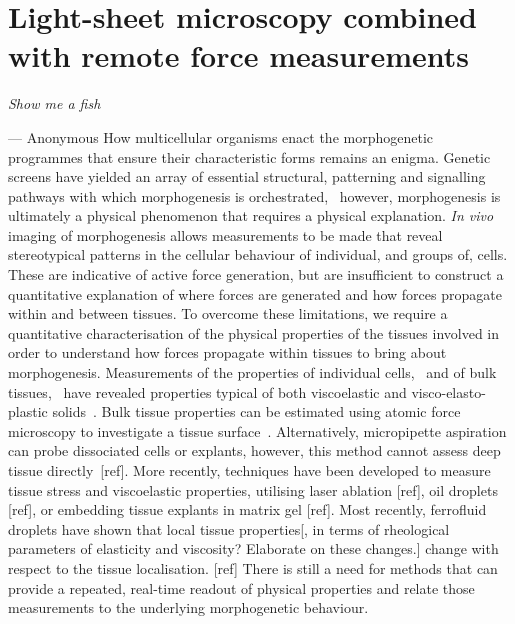 \ifpdf
    \graphicspath{{Chapter/tweezers/Figs/Raster/}{Chapter/tweezers/Figs/PDF/}{Chapter/tweezers/Figs/}}
\else
    \graphicspath{{Chapter/tweezers/Figs/Vector/}{Chapter/tweezers/Figs/}}
\fi

\chapter[Light-sheet microscopy combined with remote force measurements]{Light-sheet microscopy combined with remote force measurements}\label{chapter:tweezers}
\epigraph{\emph{Show me a fish}}{}{--- Anonymous}
How multicellular organisms enact the morphogenetic programmes that ensure their characteristic forms remains an enigma.
Genetic screens have yielded an array of essential structural, patterning and signalling pathways with which morphogenesis is orchestrated,~\cite{gilbertDevelopmentalBiology2000} however, morphogenesis is ultimately a physical phenomenon that requires a physical explanation.
\emph{In vivo} imaging of morphogenesis allows measurements to be made that reveal stereotypical patterns in the cellular behaviour of individual, and groups of, cells.
These are indicative of active force generation, but are insufficient to construct a quantitative explanation of where forces are generated and how forces propagate within and between tissues.
To overcome these limitations, we require a quantitative characterisation of the physical properties of the tissues involved in order to understand how forces propagate within tissues to bring about morphogenesis.
Measurements of the properties of individual cells,~\cite{1} and of bulk  tissues,~\cite{2} have revealed properties typical of both viscoelastic and visco-elasto-plastic solids~\cite{3}.
Bulk tissue properties can be estimated using atomic force microscopy to investigate a tissue surface~\cite{18}.
Alternatively, micropipette aspiration can probe dissociated cells or explants, however, this method cannot assess deep tissue directly~[ref].
More recently, techniques have been developed to measure tissue stress and viscoelastic properties, utilising laser ablation [ref], oil droplets [ref], or embedding tissue explants in matrix gel [ref].
Most recently, ferrofluid droplets have shown that local tissue properties[, in terms of rheological parameters of elasticity and viscosity? Elaborate on these changes.] change with respect to the tissue localisation.
[ref] There is still a need for methods that can provide a repeated, real-time readout of physical properties and relate those measurements to the underlying morphogenetic behaviour.

